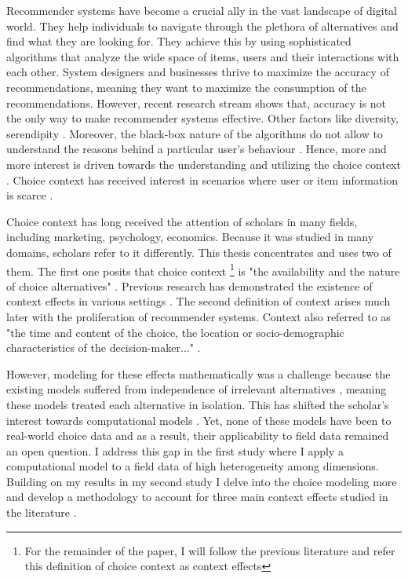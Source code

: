 \documentclass[a4paper,12pt]{article}
\begin{document}
Recommender systems have become a crucial ally in the vast landscape of digital world. They help individuals to navigate through the plethora of alternatives and find what they are looking for. They achieve this by using sophisticated algorithms that analyze the wide space of items, users and their interactions with each other. System designers and businesses thrive to maximize the accuracy of recommendations, meaning they want to maximize the consumption of the recommendations. However, recent research stream shows that, accuracy is not the only way to make recommender systems effective. Other factors like diversity, serendipity \citep{kaminskas2016diversity}. Moreover, the black-box nature of the algorithms do not allow to understand the reasons behind a particular user's behaviour \citep{samih2021exmrec2vec, kotkovSurveySerendipityRecommender2016}. Hence, more and more interest is driven towards the understanding and utilizing the choice context \citep{adomavicius2005toward}. Choice context has received interest in scenarios where user or item information is scarce \citep{scheinMethodsMetricsColdStart}.  

Choice context has long received the attention of scholars in many fields, including marketing, psychology, economics. Because it was studied in many domains, scholars refer to it differently. This thesis concentrates and uses two of them. The first one posits that choice context \footnote{For the remainder of the paper, I will follow the previous literature \citep{truebloodEtAl13} and refer this definition of choice context as context effects} is "the availability and the nature of choice alternatives" \citep{tversky1972elimination, huberEtAl82, simonson89}. Previous research has demonstrated the existence of context effects in various settings \citep{herne1997decoy, soltani2012range, evangelidisEtAl18,  wuConsguner20}. The second definition of context arises much later with the proliferation of recommender systems. Context also referred to as "the time and content of the choice, the location or socio-demographic characteristics of the decision-maker..." \citep{adomavicius2011context}. 

However, modeling for these effects mathematically was a challenge because the existing models suffered from independence of irrelevant alternatives \citep{luce59}, meaning these models treated each alternative in isolation. This has shifted the scholar's interest towards computational models \citep{usher2001time, roe2001multialternative, trueblood2014multiattribute, noguchi2018multialternative}. Yet, none of these models have been to real-world choice data and as a result, their applicability to field data remained an open question. I address this gap in the first study where I apply a computational model to a field data of high heterogeneity among dimensions. Building on my results in my second study I delve into the choice modeling more and develop a methodology to account for three main context effects studied in the literature \citep{truebloodEtAl13}. 
\end{document}
